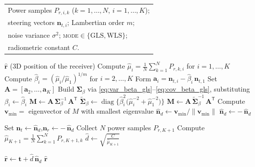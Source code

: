 \documentclass[journal]{IEEEtran}
\begin{document}
\begin{algorithm}[tb]
  \caption{3D Position Estimation from $K$ Orientations}
  \label{alg:position}
  \small
  \begin{algorithmic}[1]
  \Require
    \begin{tabular}[t]{@{}l@{}}
      Power samples $P_{r,i,k}$ ($k=1,\dots,N$, $i=1,\dots,K$);\\
      steering vectors $\mathbf n_{t,i}$; Lambertian order $m$;\\
      noise variance $\sigma^{2}$; \textsc{mode}$\in\{\mathrm{GLS},\mathrm{WLS}\}$;\\
      radiometric constant $C$.
    \end{tabular}
  \Ensure
    $\hat{\mathbf r}$ (3D position of the receiver)
  \Statex
  \State \quad Compute $\hat\mu_i=\tfrac{1}{N}\sum_{k=1}^N P_{r,k,i}$
            for $i=1,\dots,K$
  \State \quad Compute $\hat\beta_i=(\hat\mu_i/\hat\mu_1)^{1/m}$ for $i=2,\dots,K$
  \State \quad Form $\mathbf a_i = \mathbf n_{t,i} - \hat\beta_i\,\mathbf n_{t,1}$
  \State \quad Set $\mathbf A = [\mathbf a_2,\dots,\mathbf a_K]$
    \State \quad Build $\mathbf\Sigma_\beta$ via
           \eqref{eq:var_beta_gls}--\eqref{eq:cov_beta_gls},
           substituting $\beta_i \leftarrow \hat\beta_i$
    \State \quad $\mathbf M \gets \mathbf A\,\mathbf\Sigma_\beta^{-1}\,\mathbf A^{\mathsf T}$
  \Else{}
    \State \quad $\mathbf{\tilde\Sigma}_\beta \gets 
           \operatorname{diag}\bigl\{\hat\beta_i^{2}\bigl(\hat\mu_i^{-2}+\hat\mu_1^{-2}\bigr)\bigr\}$
    \State \quad $\mathbf M \gets \mathbf A\,\mathbf{\tilde\Sigma}_\beta^{-1}\,\mathbf A^{\mathsf T}$
  \EndIf
  \State \quad Compute $\mathbf v_{\min} =$ eigenvector of $M$ with smallest eigenvalue
  \State \quad $\hat{\mathbf n}_d \gets \mathbf v_{\min}/\|\mathbf v_{\min}\|$
    \State \quad $\hat{\mathbf n}_d \gets -\,\hat{\mathbf n}_d$ 
  \EndIf

  \Statex
  \State \quad Set $\mathbf n_t \gets \hat{\mathbf n}_d$,\quad $\mathbf n_r \gets -\,\hat{\mathbf n}_d$
  \State \quad Collect $N$ power samples $P_{r,K+1}$ 
  \State \quad Compute $\hat\mu_{K+1} = \tfrac{1}{N}\sum_{k=1}^{N} P_{r,K+1,k}$
  \State \quad $\hat d \gets \sqrt{\tfrac{C}{\hat\mu_{K+1}}}$

  \Statex
  \State \quad $\hat{\mathbf r} \gets \mathbf t + \hat d \,\hat{\mathbf n}_d$
  \State \Return $\hat{\mathbf r}$
  \end{algorithmic}
\end{algorithm}
\end{document}
